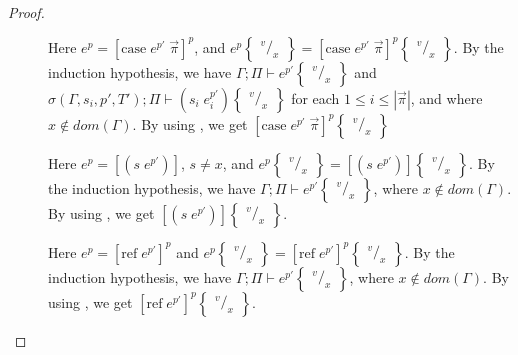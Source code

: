 \documentclass[../../master.tex]{subfiles}
\begin{document}
\begin{proof}
\begin{description}
		\item[] Here $e^p=[\mbox{case}\;e^{p'}\;\vec{\pi}]^p$, and $e^p\begin{Bmatrix} ^v/_x \end{Bmatrix}=[\mbox{case}\;e^{p'}\;\vec{\pi}]^p\begin{Bmatrix} ^v/_x \end{Bmatrix}$.
			By the induction hypothesis, we have $\Gamma;\Pi\vdash e^{p'}\begin{Bmatrix} ^v/_x \end{Bmatrix}$ and $\sigma(\Gamma,s_i,p',T');\Pi\vdash (s_i\;e_i^{p'})\begin{Bmatrix} ^v/_x \end{Bmatrix}$ for each $1\leq i \leq |\vec{\pi}|$, and where $x\notin dom(\Gamma)$.
			By using , we get $[\mbox{case}\;e^{p'}\;\vec{\pi}]^p\begin{Bmatrix} ^v/_x \end{Bmatrix}$

		\item[] Here $e^p=[(s\;e^{p'})]$, $s\neq x$, and $e^p\begin{Bmatrix} ^v/_x \end{Bmatrix}=[(s\;e^{p'})]\begin{Bmatrix} ^v/_x \end{Bmatrix}$.
		By the induction hypothesis, we have $\Gamma;\Pi\vdash e^{p'}\begin{Bmatrix} ^v/_x \end{Bmatrix}$, where $x\notin dom(\Gamma)$.
		By using , we get $[(s\;e^{p'})]\begin{Bmatrix} ^v/_x \end{Bmatrix}$.

		\item[] Here $e^p=[\mbox{ref}\;e^{p'}]^{p}$ and $e^p\begin{Bmatrix} ^v/_x \end{Bmatrix}=[\mbox{ref}\;e^{p'}]^{p}\begin{Bmatrix} ^v/_x \end{Bmatrix}$.
		By the induction hypothesis, we have $\Gamma;\Pi\vdash e^{p'}\begin{Bmatrix} ^v/_x \end{Bmatrix}$, where $x\notin dom(\Gamma)$.
		By using , we get $[\mbox{ref}\;e^{p'}]^{p}\begin{Bmatrix} ^v/_x \end{Bmatrix}$.



\end{description}
\end{proof}
\end{document}
